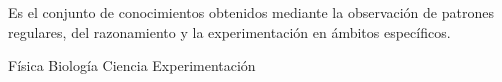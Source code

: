 
\question Es el conjunto de conocimientos obtenidos mediante la observación
  de patrones regulares, del razonamiento y la experimentación en ámbitos
  específicos.

  \begin{oneparchoices}
    \choice Física
    \choice Biología
    \CorrectChoice Ciencia
    \choice Experimentación
  \end{oneparchoices}
  \answerline[C]
